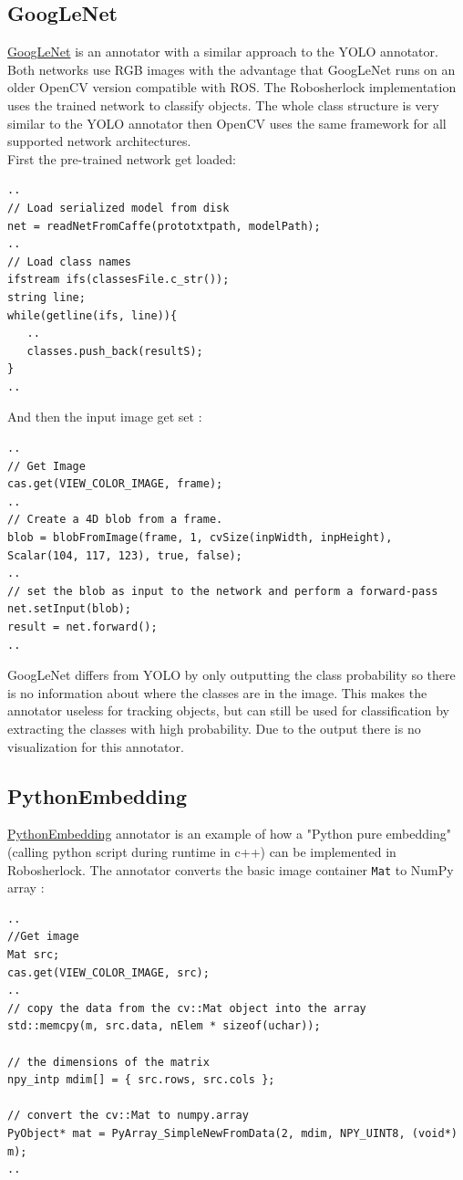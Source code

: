 \documentclass[main.tex]{subfiles}
\begin{document}
				\subsection{GoogLeNet}
\href{https://github.com/SUTURO/suturo_perception/blob/Handcamera_tracking/rs_Athene/src/GoogLeNet.cpp}{GoogLeNet} is an annotator with a similar approach to the YOLO annotator. Both networks use RGB images with the advantage that GoogLeNet runs on an older OpenCV version compatible with ROS.
The Robosherlock implementation uses the trained network to classify objects. The whole class structure is very similar to the YOLO annotator then OpenCV uses the same framework for all supported network architectures. \\
First the pre-trained network get loaded: 
\begin{lstlisting}
.. 
// Load serialized model from disk
net = readNetFromCaffe(prototxtpath, modelPath);
..
// Load class names 
ifstream ifs(classesFile.c_str());
string line;
while(getline(ifs, line)){
   ..
   classes.push_back(resultS);
}
..
\end{lstlisting}
And then the input image get set : 
\begin{lstlisting}
..
// Get Image 
cas.get(VIEW_COLOR_IMAGE, frame);
..
// Create a 4D blob from a frame.
blob = blobFromImage(frame, 1, cvSize(inpWidth, inpHeight), Scalar(104, 117, 123), true, false);
..
// set the blob as input to the network and perform a forward-pass
net.setInput(blob);
result = net.forward();
..
\end{lstlisting}
GoogLeNet differs from YOLO by only outputting the class probability so there is no information about where the classes are in the image. This makes the annotator useless for tracking objects, but can still be used for classification by extracting the classes with high probability.
Due to the output there is no visualization for this annotator.

				\subsection{PythonEmbedding}
\href{https://github.com/SUTURO/suturo_perception/blob/Handcamera_tracking/rs_Athene/src/PythonEmbedding.cpp}{PythonEmbedding} annotator is an example of how a "Python pure embedding" (calling python script during runtime in c++) can be implemented in Robosherlock. The annotator converts the basic image container \texttt{Mat} to NumPy array : 
\begin{lstlisting}
..
//Get image
Mat src;
cas.get(VIEW_COLOR_IMAGE, src);
..
// copy the data from the cv::Mat object into the array
std::memcpy(m, src.data, nElem * sizeof(uchar));

// the dimensions of the matrix
npy_intp mdim[] = { src.rows, src.cols };
    
// convert the cv::Mat to numpy.array
PyObject* mat = PyArray_SimpleNewFromData(2, mdim, NPY_UINT8, (void*) m);
..
\end{lstlisting}
\end{document}
